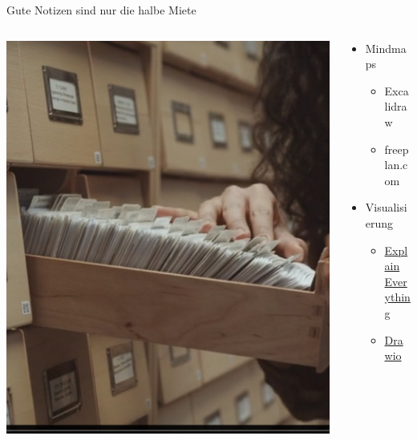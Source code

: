 \documentclass[aspectratio=169,shownotes]{beamer}
\begin{document}
\begin{frame}{Gute Notizen sind nur die halbe Miete}
    \begin{columns}
        \begin{column}{0.4\textwidth}
            \includegraphics[width=\textwidth]{graphics/Zettelkasten.png}
        \end{column}
        \begin{column}[t]{0.6\textwidth}
            \vspace{-3cm}
            \begin{itemize}[]
                \item Mindmaps
                \begin{itemize}
                    \item Excalidraw
                    \item freeplan.com
                \end{itemize}
                \item Visualisierung
                \begin{itemize}
                    \item \href{https://explaineverything.com/}{Explain Everything}
                    \item \href{https://www.drawio.com/}{Drawio}
                \end{itemize}
            \end{itemize} 


            
        \end{column}        
    \end{columns}    
\end{frame}
\end{document}
